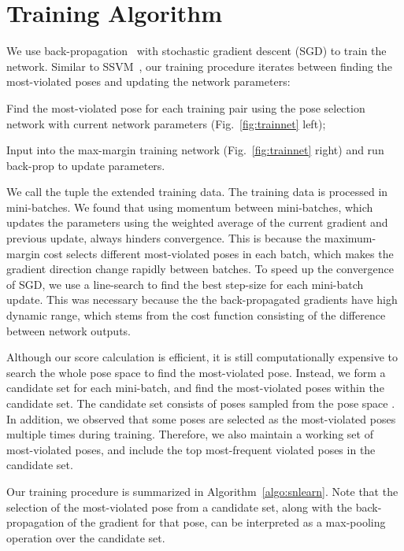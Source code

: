 \documentclass[10pt,twocolumn,letterpaper]{article}
\begin{document}
\section{Training Algorithm} 
\label{sec:Training}
\vspace{-0.1in}

We use back-propagation~\cite{Rumelhart:1988} with stochastic gradient descent (SGD)  to train the network.
Similar to SSVM~\cite{Joachims:2009}, 
our training procedure iterates between finding the most-violated poses and updating the network parameters:
\begin{compactenum}
\item Find the most-violated pose  for each training pair  using the pose selection network  with current network parameters (Fig.~\ref{fig:trainnet} left);
\item Input 
into the max-margin training network (Fig.~\ref{fig:trainnet} right) and run back-prop to update parameters.
\end{compactenum}
We call the tuple  the extended training data. 
The training data is processed in mini-batches.
We found that using momentum between mini-batches,
which updates the parameters  using the weighted average of the current gradient and previous update, 
always hinders convergence.
This is because the maximum-margin cost selects different most-violated poses in each batch, 
which makes the gradient direction change rapidly between batches.
To speed up the convergence of SGD, we use a line-search to find the best step-size for each mini-batch update.
This was necessary because the the back-propagated gradients have high dynamic range, which stems from the cost function consisting of the difference between network outputs.


Although our score calculation is efficient, it is still computationally expensive to search the whole pose space to find the most-violated pose. 
Instead, we form a candidate set  for each mini-batch, and find the most-violated poses within the candidate set. 
The candidate set consists of  poses sampled from the pose space .  
In addition, we observed that some poses are selected as the most-violated poses multiple times during training.
Therefore, we also maintain a working set of most-violated poses, and include the top  most-frequent violated poses in the candidate set.


Our training procedure is summarized in Algorithm~\ref{algo:snlearn}.
Note that the selection of the most-violated pose from a candidate set, along with the back-propagation of the gradient for that pose, can be interpreted as a max-pooling operation over the candidate set.
\end{document}
